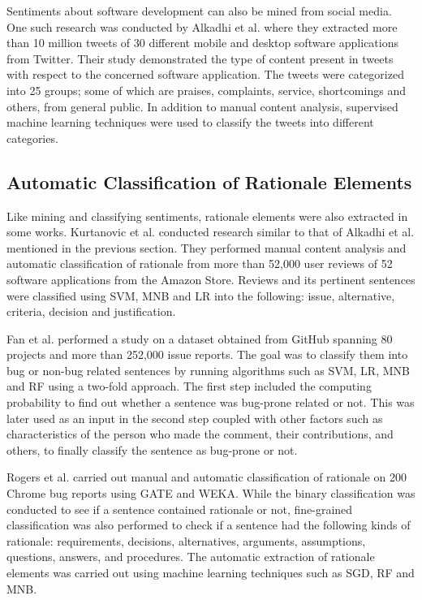 \documentclass[a4paper,12pt,twoside]{report}
\begin{document}
Sentiments about software development can also be mined from social media. One such research was conducted by Alkadhi et al. where they extracted more than 10 million tweets of 30 different mobile and desktop software applications from Twitter. Their study demonstrated the type of content present in tweets with respect to the concerned software application. The tweets were categorized into 25 groups; some of which are praises, complaints, service, shortcomings and others, from general public. In addition to manual content analysis, supervised machine learning techniques were used to classify the tweets into different categories. 

\subsection{Automatic Classification of Rationale Elements}
Like mining and classifying sentiments, rationale elements were also extracted in some works. Kurtanovic et al. conducted research similar to that of Alkadhi et al. mentioned in the previous section. They performed manual content analysis and automatic classification of rationale from more than 52,000 user reviews of 52 software applications from the Amazon Store. Reviews and its pertinent sentences were classified using SVM, MNB and LR into the following: issue, alternative, criteria, decision and justification.  

Fan et al. performed a study on a dataset obtained from GitHub spanning 80 projects and more than 252,000 issue reports. The goal was to classify them into bug or non-bug related sentences by running algorithms such as SVM, LR, MNB and RF using a two-fold approach. The first step included the computing probability to find out whether a sentence was bug-prone related or not. This was later used as an input in the second step coupled with other factors such as characteristics of the person who made the comment, their contributions, and others, to finally classify the sentence as bug-prone or not. 

Rogers et al. carried out manual and automatic classification of rationale on 200 Chrome bug reports using GATE and WEKA. While the binary classification was conducted to see if a sentence contained rationale or not, fine-grained classification was also performed to check if a sentence had the following kinds of rationale: requirements, decisions, alternatives, arguments, assumptions, questions, answers, and procedures. The automatic extraction of rationale elements was carried out using machine learning techniques such as SGD, RF and MNB. 
\end{document}
